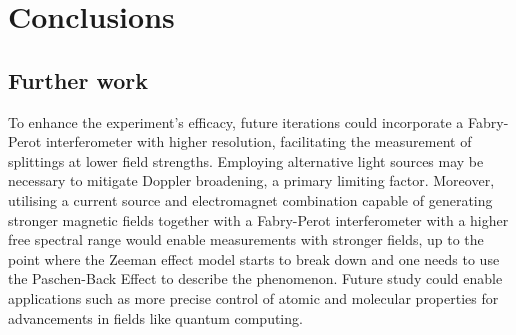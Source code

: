\documentclass[11pt]{article}
\begin{document}
\section{Conclusions} \label{sec: conclusion}
\subsection{Further work}
To enhance the experiment's efficacy, future iterations could incorporate a Fabry-Perot interferometer with higher resolution, facilitating the measurement of splittings at lower field strengths. Employing alternative light sources may be necessary to mitigate Doppler broadening, a primary limiting factor. Moreover, utilising a current source and electromagnet combination capable of generating stronger magnetic fields together with a Fabry-Perot interferometer with a higher free spectral range would enable measurements with stronger fields, up to the point where the Zeeman effect model starts to break down and one needs to use the Paschen-Back Effect to describe the phenomenon. Future study could enable applications such as more precise control of atomic and molecular properties for advancements in fields like quantum computing.
\end{document}
